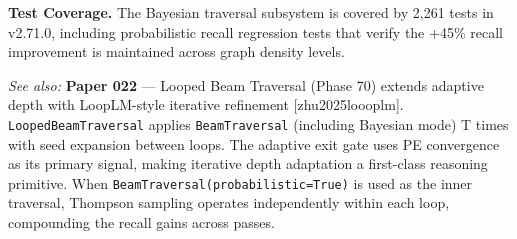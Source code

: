 \textbf{Test Coverage.} The Bayesian traversal subsystem is covered by 2,261 tests in v2.71.0, including probabilistic recall regression tests that verify the +45\% recall improvement is maintained across graph density levels.

\textit{See also:} \textbf{Paper 022} --- Looped Beam Traversal (Phase 70) extends adaptive depth with LoopLM-style iterative refinement [zhu2025loooplm]. \texttt{LoopedBeamTraversal} applies \texttt{BeamTraversal} (including Bayesian mode) T times with seed expansion between loops. The adaptive exit gate uses PE convergence as its primary signal, making iterative depth adaptation a first-class reasoning primitive. When \texttt{BeamTraversal(probabilistic=True)} is used as the inner traversal, Thompson sampling operates independently within each loop, compounding the recall gains across passes.